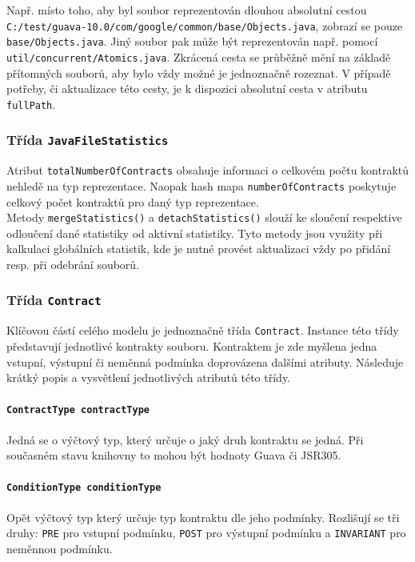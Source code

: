 					Např. místo toho, aby byl soubor reprezentován dlouhou absolutní cestou \texttt{C:/test/guava-10.0/com/google/common/base/Objects.java}, zobrazí se pouze \texttt{base/Objects.java}. Jiný soubor pak může být reprezentován např. pomocí \texttt{util/concurrent/Atomics.java}. Zkrácená cesta se průběžně mění na základě přítomných souborů, aby bylo vždy možné je jednoznačně rozeznat. V případě potřeby, či aktualizace této cesty, je k dispozici absolutní cesta v atributu \texttt{fullPath}.
				
				\subsubsection{Třída \texttt{JavaFileStatistics}} 
					Atribut \texttt{totalNumberOfContracts} obsahuje informaci o celkovém počtu kontraktů nehledě na typ reprezentace. Naopak hash mapa \texttt{numberOfContracts} poskytuje celkový počet kontraktů pro daný typ reprezentace.\\
				
				Metody \texttt{mergeStatistics()} a \texttt{detachStatistics()} slouží ke sloučení respektive odloučení dané statistiky od aktivní statistiky. Tyto metody jsou využity při kalkulaci globálních statistik, kde je nutné provést aktualizaci vždy po přidání resp. při odebrání souborů.
					
				
				\subsubsection{Třída \texttt{Contract}}	
					Klíčovou částí celého modelu je jednoznačně třída \texttt{Contract}. Instance této třídy představují jednotlivé kontrakty souboru. Kontraktem je zde myšlena jedna vstupní, výstupní či neměnná podmínka doprovázena dalšími atributy. Následuje krátký popis a vysvětlení jednotlivých atributů této třídy.
					
					\paragraph{\texttt{ContractType contractType}} 
						Jedná se o výčtový typ, který určuje o jaký druh kontraktu se jedná. Při současném stavu knihovny to mohou být hodnoty Guava či JSR305.
			
					\paragraph{\texttt{ConditionType conditionType}} 
						Opět výčtový typ který určuje typ kontraktu dle jeho podmínky. Rozlišují se tři druhy: \texttt{PRE} pro vstupní podmínku, \texttt{POST} pro výstupní podmínku a \texttt{INVARIANT} pro neměnnou podmínku.
			
